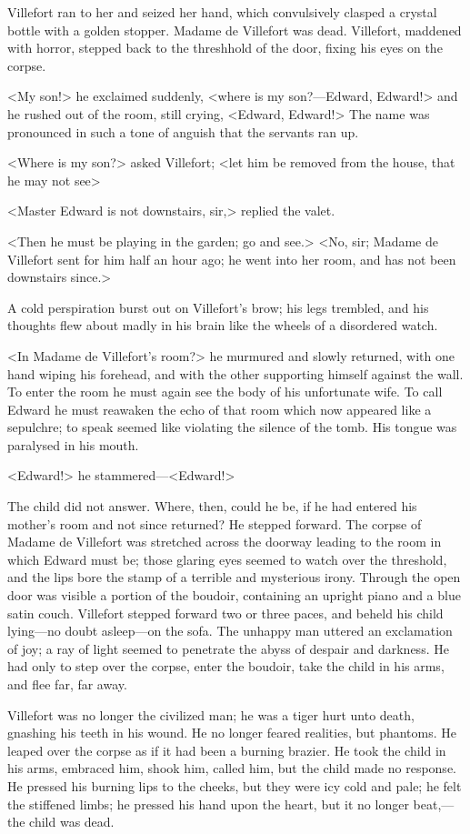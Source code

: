  Villefort ran to her and seized her hand, which convulsively clasped a crystal bottle with a golden stopper. Madame de Villefort was dead. Villefort, maddened with horror, stepped back to the threshhold of the door, fixing his eyes on the corpse. 

 <My son!> he exclaimed suddenly, <where is my son?—Edward, Edward!> and he rushed out of the room, still crying, <Edward, Edward!> The name was pronounced in such a tone of anguish that the servants ran up. 

 <Where is my son?> asked Villefort; <let him be removed from the house, that he may not see\longdash> 

 <Master Edward is not downstairs, sir,> replied the valet. 

 <Then he must be playing in the garden; go and see.>  <No, sir; Madame de Villefort sent for him half an hour ago; he went into her room, and has not been downstairs since.> 

 A cold perspiration burst out on Villefort's brow; his legs trembled, and his thoughts flew about madly in his brain like the wheels of a disordered watch. 

 <In Madame de Villefort's room?> he murmured and slowly returned, with one hand wiping his forehead, and with the other supporting himself against the wall. To enter the room he must again see the body of his unfortunate wife. To call Edward he must reawaken the echo of that room which now appeared like a sepulchre; to speak seemed like violating the silence of the tomb. His tongue was paralysed in his mouth. 

 <Edward!> he stammered—<Edward!> 

 The child did not answer. Where, then, could he be, if he had entered his mother's room and not since returned? He stepped forward. The corpse of Madame de Villefort was stretched across the doorway leading to the room in which Edward must be; those glaring eyes seemed to watch over the threshold, and the lips bore the stamp of a terrible and mysterious irony. Through the open door was visible a portion of the boudoir, containing an upright piano and a blue satin couch. Villefort stepped forward two or three paces, and beheld his child lying—no doubt asleep—on the sofa. The unhappy man uttered an exclamation of joy; a ray of light seemed to penetrate the abyss of despair and darkness. He had only to step over the corpse, enter the boudoir, take the child in his arms, and flee far, far away. 

 Villefort was no longer the civilized man; he was a tiger hurt unto death, gnashing his teeth in his wound. He no longer feared realities, but phantoms. He leaped over the corpse as if it had been a burning brazier. He took the child in his arms, embraced him, shook him, called him, but the child made no response. He pressed his burning lips to the cheeks, but they were icy cold and pale; he felt the stiffened limbs; he pressed his hand upon the heart, but it no longer beat,—the child was dead. 

